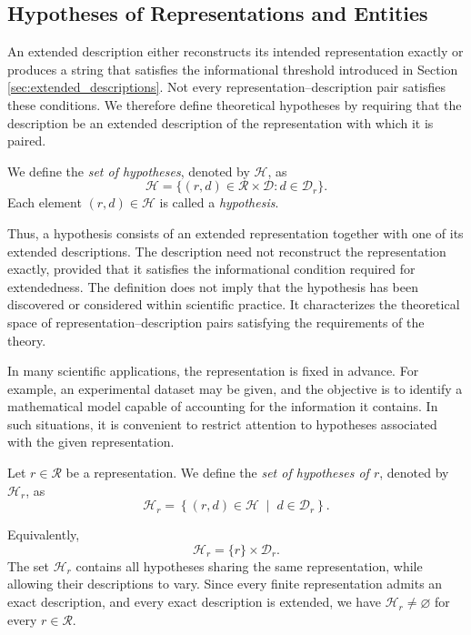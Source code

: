 
\subsection*{Hypotheses of Representations and Entities}

An extended description either reconstructs its intended representation exactly or produces a string that satisfies the informational threshold introduced in Section \ref{sec:extended_descriptions}. Not every representation--description pair satisfies these conditions. We therefore define theoretical hypotheses by requiring that the description be an extended description of the representation with which it is paired.

\begin{definition}
\label{def:hypothesis}
We define the \emph{set of hypotheses}, denoted by $\mathcal{H}$, as
\[
\mathcal{H}=\{(r,d)\in\mathcal{R}\times\mathcal{D}:d\in\mathcal{D}_{r}\}.
\]
Each element $(r,d)\in\mathcal{H}$ is called a \emph{hypothesis}.
\end{definition}

Thus, a hypothesis consists of an extended representation together with one of its extended descriptions. The description need not reconstruct the representation exactly, provided that it satisfies the informational condition required for extendedness. The definition does not imply that the hypothesis has been discovered or considered within scientific practice. It characterizes the theoretical space of representation--description pairs satisfying the requirements of the theory.

In many scientific applications, the representation is fixed in advance. For example, an experimental dataset may be given, and the objective is to identify a mathematical model capable of accounting for the information it contains. In such situations, it is convenient to restrict attention to hypotheses associated with the given representation.

\begin{definition}
\label{def:hypotheses_for_representation}
Let $r\in\mathcal{R}$ be a representation. We define the \emph{set of hypotheses of $r$}, denoted by $\mathcal{H}_r$, as
\[
\mathcal{H}_r = \left\{(r,d)\in\mathcal{H} \;\middle|\; d\in\mathcal{D}_r \right\}.
\]
\end{definition}

Equivalently,
\[
\mathcal{H}_r=\{r\}\times\mathcal{D}_r.
\]
The set $\mathcal{H}_r$ contains all hypotheses sharing the same representation, while allowing their descriptions to vary. Since every finite representation admits an exact description, and every exact description is extended, we have $\mathcal{H}_r\neq\varnothing$ for every $r\in\mathcal{R}$.

